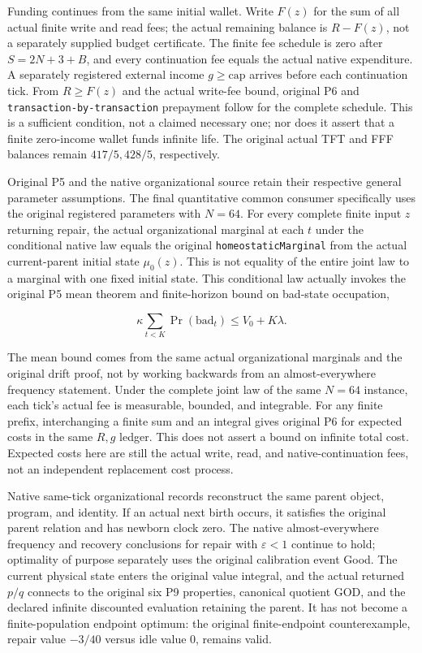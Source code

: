 \documentclass[
  english,
  11pt,
  oneside]{book}
\begin{document}
Funding continues from the same initial wallet. Write \(F(z)\) for the sum of all actual finite write and read fees; the actual remaining balance is \(R-F(z)\), not a separately supplied budget certificate. The finite fee schedule is zero after \(S=2N+3+B\), and every continuation fee equals the actual native expenditure. A separately registered external income \(g\ge\mathrm{cap}\) arrives before each continuation tick. From \(R\ge F(z)\) and the actual write-fee bound, original P6 and \nolinkurl{transaction-by-transaction} prepayment follow for the complete schedule. This is a sufficient condition, not a claimed necessary one; nor does it assert that a finite zero-income wallet funds infinite life. The original actual TFT and FFF balances remain \(417/5,428/5\), respectively.

Original P5 and the native organizational source retain their respective general parameter assumptions. The final quantitative common consumer specifically uses the original registered parameters with \(N=64\). For every complete finite input \(z\) returning repair, the actual organizational marginal at each \(t\) under the conditional native law equals the original \nolinkurl{homeostaticMarginal} from the actual current-parent initial state \(\mu_0(z)\). This is not equality of the entire joint law to a marginal with one fixed initial state. This conditional law actually invokes the original P5 mean theorem and finite-horizon bound on bad-state occupation,

\[\kappa\sum_{t<K}\Pr(\mathrm{bad}_t)
\le V_0+K\lambda.\]

The mean bound comes from the same actual organizational marginals and the original drift proof, not by working backwards from an almost-everywhere frequency statement. Under the complete joint law of the same \(N=64\) instance, each tick's actual fee is measurable, bounded, and integrable. For any finite prefix, interchanging a finite sum and an integral gives original P6 for expected costs in the same \(R,g\) ledger. This does not assert a bound on infinite total cost. Expected costs here are still the actual write, read, and native-continuation fees, not an independent replacement cost process.

Native same-tick organizational records reconstruct the same parent object, program, and identity. If an actual next birth occurs, it satisfies the original parent relation and has newborn clock zero. The native almost-everywhere frequency and recovery conclusions for repair with \(\varepsilon<1\) continue to hold; optimality of purpose separately uses the original calibration event Good. The current physical state enters the original value integral, and the actual returned \(p/q\) connects to the original six P9 properties, canonical quotient GOD, and the declared infinite discounted evaluation retaining the parent. It has not become a finite-population endpoint optimum: the original finite-endpoint counterexample, repair value \(-3/40\) versus idle value 0, remains valid.
\end{document}
